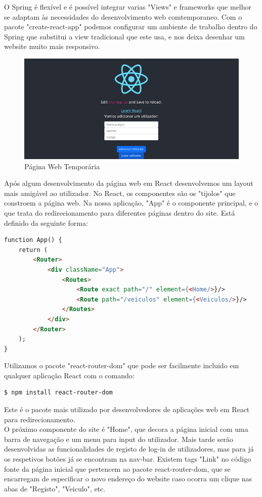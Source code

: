 \documentclass[11pt,a4paper]{report}%
\begin{document}
O Spring é flexível e é possível integrar varias "Views" e frameworks que melhor se adaptam às necessidades do desenvolvimento web comtemporaneo. 
Com o pacote "create-react-app" podemos configurar um ambiente de trabalho dentro do Spring que substitui a view tradicional que este usa, e nos deixa desenhar um website muito mais responsivo.
\pageref{bib}

\begin{figure}[h!]
\centering
\includegraphics[scale=1.0]{Pictures/Menu1.png}
\caption{\label{fig:Diagrama} Página Web Temporária}
\end{figure}

Após algum desenvolvimento da página web em React desenvolvemos um layout mais amigável ao utilizador. No React, os componentes são os "tijolos" que constroem a página web. Na nossa aplicação, "App" é o componente principal, e o que trata do redirecionamento para diferentes páginas dentro do site. Está definido da seguinte forma:  

\begin{lstlisting}[language=Html, caption=Componente App do React]
function App() {
    return (
        <Router>
            <div className="App">
                <Routes>
                    <Route exact path="/" element={<Home/>}/>
                    <Route path="/veiculos" element={<Veiculos/>}/>
                </Routes>
            </div>
        </Router>
    );
}
\end{lstlisting}

Utilizamos o pacote "react-router-dom" que pode ser facilmente incluido em qualquer aplicação React com o comando:
\begin{lstlisting}[language=bash]
  $ npm install react-router-dom
\end{lstlisting}
Este é o pacote mais utilizado por desenvolvedores de aplicações web em React para redirecionamento. \\
O próximo componente do site é "Home", que decora a página inicial com uma barra de navegação e um menu para input do utilizador. Mais tarde serão desenvolvidas as funcionalidades de registo de log-in de utilizadores, mas para já os respetivos botões já se encontram na nav-bar. 
Existem tags "Link" no código fonte da página inicial que pertencem ao pacote react-router-dom, que se encarregam de especificar o novo endereço do website caso ocorra um clique nas abas de "Registo", "Veiculo", etc. \\
\end{document}

